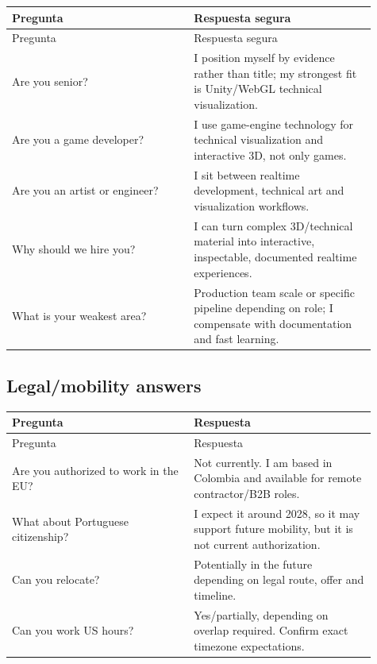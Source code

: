 \begin{center}
\scriptsize
\begin{longtable}{>{\raggedright\arraybackslash}p{0.455\linewidth} >{\raggedright\arraybackslash}p{0.455\linewidth}}
\toprule
Pregunta & Respuesta segura \\
\midrule
\endfirsthead
\toprule
Pregunta & Respuesta segura \\
\midrule
\endhead
Are you senior? & I position myself by evidence rather than title; my strongest fit is Unity/WebGL technical visualization. \\
Are you a game developer? & I use game-engine technology for technical visualization and interactive 3D, not only games. \\
Are you an artist or engineer? & I sit between realtime development, technical art and visualization workflows. \\
Why should we hire you? & I can turn complex 3D/technical material into interactive, inspectable, documented realtime experiences. \\
What is your weakest area? & Production team scale or specific pipeline depending on role; I compensate with documentation and fast learning. \\
\bottomrule
\end{longtable}
\end{center}


\subsection{Legal/mobility answers}


\begin{center}
\scriptsize
\begin{longtable}{>{\raggedright\arraybackslash}p{0.455\linewidth} >{\raggedright\arraybackslash}p{0.455\linewidth}}
\toprule
Pregunta & Respuesta \\
\midrule
\endfirsthead
\toprule
Pregunta & Respuesta \\
\midrule
\endhead
Are you authorized to work in the EU? & Not currently. I am based in Colombia and available for remote contractor/B2B roles. \\
What about Portuguese citizenship? & I expect it around 2028, so it may support future mobility, but it is not current authorization. \\
Can you relocate? & Potentially in the future depending on legal route, offer and timeline. \\
Can you work US hours? & Yes/partially, depending on overlap required. Confirm exact timezone expectations. \\
\bottomrule
\end{longtable}
\end{center}


